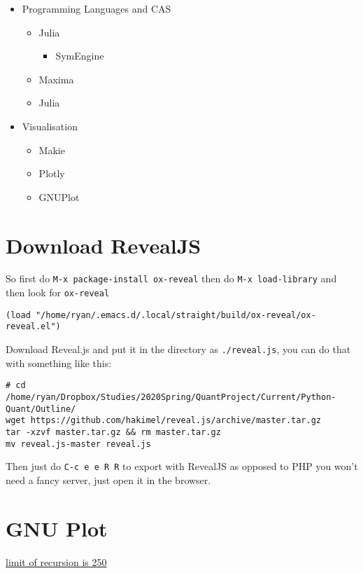 \documentclass[11pt]{article}
\begin{document}
\begin{enumerate}
\begin{itemize}
\item Programming Languages and CAS
\begin{itemize}
\item Julia
\begin{itemize}
\item SymEngine
\end{itemize}
\item Maxima
\item Julia
\end{itemize}
\item Visualisation
\begin{itemize}
\item Makie
\item Plotly
\item GNUPlot
\end{itemize}
\end{itemize}
\end{enumerate}

\section{Download RevealJS}
\label{sec:org09a576b}
So first do \texttt{M-x package-install ox-reveal} then do \texttt{M-x load-library} and then look for \texttt{ox-reveal}

\begin{verbatim}
(load "/home/ryan/.emacs.d/.local/straight/build/ox-reveal/ox-reveal.el")
\end{verbatim}

Download Reveal.js and put it in the directory as \texttt{./reveal.js}, you can do that with something like this:

\begin{verbatim}
# cd /home/ryan/Dropbox/Studies/2020Spring/QuantProject/Current/Python-Quant/Outline/
wget https://github.com/hakimel/reveal.js/archive/master.tar.gz
tar -xzvf master.tar.gz && rm master.tar.gz
mv reveal.js-master reveal.js
\end{verbatim}

Then just do \texttt{C-c e e R R} to export with RevealJS as opposed to PHP you won't need a fancy server, just open it in the browser.
\section{GNU Plot}
\label{sec:org7a1ee34}
\href{https://rosettacode.org/wiki/Find\_limit\_of\_recursion\#gnuplot}{limit of recursion is 250}
\end{document}
